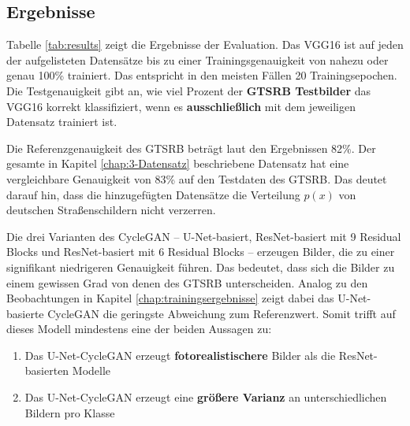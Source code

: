
\subsection{Ergebnisse}

Tabelle \ref{tab:results} zeigt die Ergebnisse der Evaluation. Das VGG16 ist auf jeden der aufgelisteten Datensätze bis zu einer Trainingsgenauigkeit von nahezu oder genau 100\% trainiert. Das entspricht in den meisten Fällen 20 Trainingsepochen. Die Testgenauigkeit gibt an, wie viel Prozent der \textbf{\ac{GTSRB} Testbilder} das VGG16 korrekt klassifiziert, wenn es \textbf{ausschließlich} mit dem jeweiligen Datensatz trainiert ist.

Die Referenzgenauigkeit des \ac{GTSRB} beträgt laut den Ergebnissen 82\%. Der gesamte in Kapitel \ref{chap:3-Datensatz} beschriebene Datensatz hat eine vergleichbare Genauigkeit von 83\% auf den Testdaten des \ac{GTSRB}. Das deutet darauf hin, dass die hinzugefügten Datensätze die Verteilung $p(x)$ von deutschen Straßenschildern nicht verzerren.

Die drei Varianten des \ac{CycleGAN} -- U-Net-basiert, ResNet-basiert mit 9 Residual Blocks und ResNet-basiert mit 6 Residual Blocks -- erzeugen Bilder, die zu einer signifikant niedrigeren Genauigkeit führen. Das bedeutet, dass sich die Bilder zu einem gewissen Grad von denen des \ac{GTSRB} unterscheiden. Analog zu den Beobachtungen in Kapitel \ref{chap:trainingsergebnisse} zeigt dabei das U-Net-basierte \ac{CycleGAN} die geringste Abweichung zum Referenzwert. Somit trifft auf dieses Modell mindestens eine der beiden Aussagen zu:
\begin{enumerate}
	\item Das U-Net-\ac{CycleGAN} erzeugt \textbf{fotorealistischere} Bilder als die ResNet-basierten Modelle
	\item Das U-Net-\ac{CycleGAN} erzeugt eine \textbf{größere Varianz} an unterschiedlichen Bildern pro Klasse
\end{enumerate}

